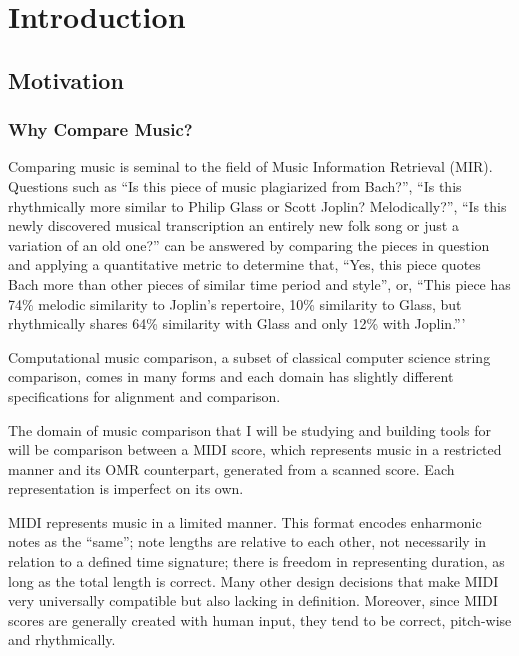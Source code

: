 \chapter{Introduction}

\section{Motivation}
\subsection{Why Compare Music?}
Comparing music is seminal to the field of Music Information Retrieval (MIR). Questions such as ``Is this piece of music plagiarized from Bach?'', ``Is this rhythmically more similar to Philip Glass or Scott Joplin? Melodically?'', ``Is this newly discovered musical transcription an entirely new folk song or just a variation of an old one?'' can be answered by comparing the pieces in question and applying a quantitative metric to determine that, ``Yes, this piece quotes Bach more than other pieces of similar time period and style'', or, ``This piece has 74\% melodic similarity to Joplin's repertoire, 10\% similarity to Glass, but rhythmically shares 64\% similarity with Glass and only 12\% with Joplin.'''

Computational music comparison, a subset of classical computer science string comparison, comes in many forms and each domain has slightly different specifications for alignment and comparison. 

The domain of music comparison that I will be studying and building tools for will be comparison between a MIDI score, which represents music in a restricted manner and its OMR counterpart, generated from a scanned score. Each representation is imperfect on its own.

MIDI represents music in a limited manner. This format encodes enharmonic notes as the ``same''; note lengths are relative to each other, not necessarily in relation to a defined time signature; there is freedom in representing duration, as long as the total length is correct. Many other design decisions that make MIDI very universally compatible but also lacking in definition. Moreover, since MIDI scores are generally created with human input, they tend to be correct, pitch-wise and rhythmically. 
 
